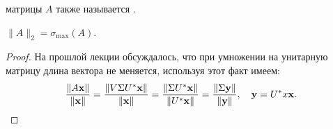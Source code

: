 \begin{remark}
     матрицы $A$ также называется .
\end{remark}

\begin{claim}
    $\|A\|_2=\sigma_{\max}(A)$.

    \begin{proof}
        На прошлой лекции обсуждалось, что при умножении на унитарную матрицу длина вектора не меняется, используя этот 
        факт имеем:
        \[
            \dfrac{\|A\mathbf{x}\|}{\|\mathbf{x}\|}=\dfrac{\|V\Sigma U^*\mathbf{x}\|}{\|\mathbf{x}\|}=
            \dfrac{\|\Sigma U^*\mathbf{x}\|}{\|U^*\mathbf{x}\|}=\dfrac{\|\Sigma\mathbf{y}\|}{\|\mathbf{y}\|}, \quad \mathbf{y}=U^*x\mathbf{x}.
        \]

    \end{proof}
\end{claim}